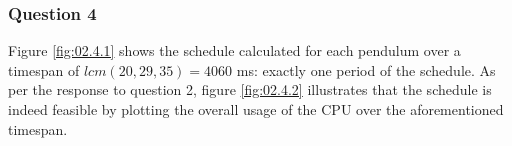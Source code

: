 \subsubsection{Question 4}

Figure \ref{fig:02.4.1} shows the schedule calculated for each pendulum over a
timespan of $lcm(20,29,35) = 4060$ ms: exactly one period of the schedule.
As per the response to question 2, figure \ref{fig:02.4.2} illustrates that the
schedule is indeed feasible by plotting the overall usage of the CPU over the
aforementioned timespan.


\noindent{}
